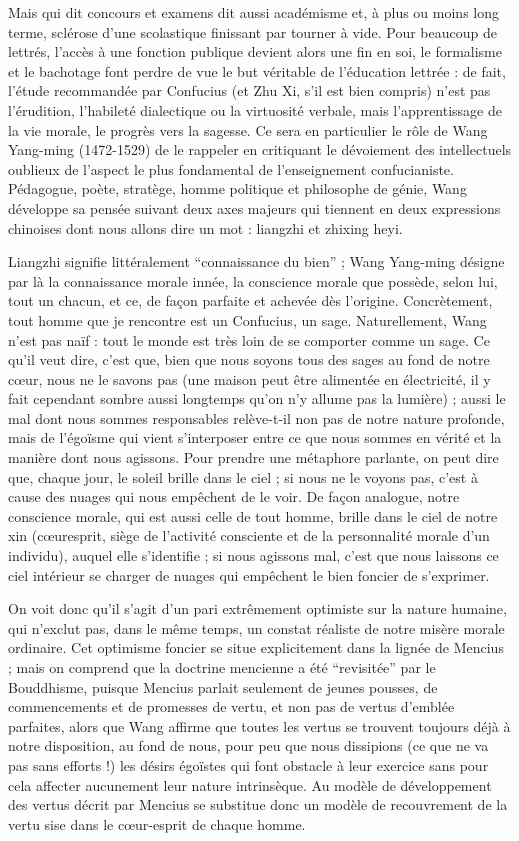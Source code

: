 \documentclass[11pt,a4paper]{article} %
\begin{document}
Mais qui dit concours et examens dit aussi académisme et, à plus ou moins long terme,
sclérose d'une scolastique finissant par tourner à vide.
Pour beaucoup de lettrés, l'accès
à une fonction publique devient alors une fin en soi, le formalisme et le bachotage font
perdre de vue le but véritable de l'éducation lettrée : de fait, l'étude recommandée par
Confucius (et Zhu Xi, s'il est bien compris) n'est pas l'érudition, l'habileté dialectique
ou la virtuosité verbale, mais l'apprentissage de la vie morale, le progrès vers la sagesse.
Ce sera en particulier le rôle de Wang Yang-ming (1472-1529) de le rappeler en critiquant le dévoiement des intellectuels oublieux de l'aspect le plus fondamental de
l'enseignement confucianiste.
Pédagogue, poète, stratège, homme politique et philosophe de génie, Wang développe sa pensée suivant deux axes majeurs qui tiennent en
deux expressions chinoises dont nous allons dire un mot : liangzhi et zhixing heyi.

Liangzhi signifie littéralement ``connaissance du bien'' ; Wang Yang-ming désigne par
là la connaissance morale innée, la conscience morale que possède, selon lui, tout un
chacun, et ce, de façon parfaite et achevée dès l'origine.
Concrètement, tout homme que
je rencontre est un Confucius, un sage.
Naturellement, Wang n'est pas naïf : tout le
monde est très loin de se comporter comme un sage.
Ce qu'il veut dire, c'est que, bien
que nous soyons tous des sages au fond de notre cœur, nous ne le savons pas (une maison peut être alimentée en électricité, il y fait cependant sombre aussi longtemps qu'on
n'y allume pas la lumière) ; aussi le mal dont nous sommes responsables relève-t-il non
pas de notre nature profonde, mais de l'égoïsme qui vient s'interposer entre ce que nous
sommes en vérité et la manière dont nous agissons.
Pour prendre une métaphore parlante, on peut dire que, chaque jour, le soleil brille dans le ciel ; si nous ne le voyons pas,
c'est à cause des nuages qui nous empêchent de le voir.
De façon analogue, notre conscience morale, qui est aussi celle de tout homme, brille dans le ciel de notre xin (cœuresprit, siège de l'activité consciente et de la personnalité morale d'un individu), auquel
elle s'identifie ; si nous agissons mal, c'est que nous laissons ce ciel intérieur se charger
de nuages qui empêchent le bien foncier de s'exprimer.

On voit donc qu'il s'agit d'un pari extrêmement optimiste sur la nature humaine, qui
n'exclut pas, dans le même temps, un constat réaliste de notre misère morale ordinaire.
Cet optimisme foncier se situe explicitement dans la lignée de Mencius ; mais on comprend que la doctrine mencienne a été ``revisitée'' par le Bouddhisme, puisque Mencius
parlait seulement de jeunes pousses, de commencements et de promesses de vertu, et
non pas de vertus d'emblée parfaites, alors que Wang affirme que toutes les vertus se
trouvent toujours déjà à notre disposition, au fond de nous, pour peu que nous dissipions
(ce que ne va pas sans efforts !) les désirs égoïstes qui font obstacle à leur exercice sans
pour cela affecter aucunement leur nature intrinsèque.
Au modèle de développement des
vertus décrit par Mencius se substitue donc un modèle de recouvrement de la vertu sise
dans le cœur-esprit de chaque homme.
\end{document}
